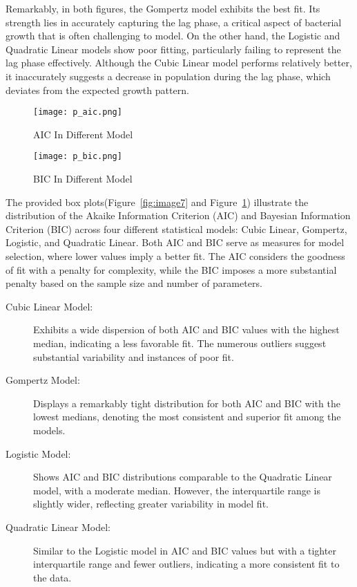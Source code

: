 \documentclass[11pt]{article}
\begin{document}
Remarkably, in both figures, the Gompertz model exhibits the best fit. Its strength lies in accurately capturing the lag phase, a critical aspect of bacterial growth that is often challenging to model. On the other hand, the Logistic and Quadratic Linear models show poor fitting, particularly failing to represent the lag phase effectively. Although the Cubic Linear model performs relatively better, it inaccurately suggests a decrease in population during the lag phase, which deviates from the expected growth pattern.
\begin{figure}[H]
  \centering
  \begin{minipage}{0.48\textwidth}
    \texttt{[image: p\_aic.png]}
    \caption{AIC In Different Model}
    \label{fig:image7}
  \end{minipage}
  \hfill
  \begin{minipage}{0.48\textwidth}
    \texttt{[image: p\_bic.png]}
    \caption{BIC In Different Model}
    \label{fig:image8}
  \end{minipage}
\end{figure}


The provided box plots(Figure~\ref{fig:image7} and Figure~\ref{fig:image8}) illustrate the distribution of the Akaike Information Criterion (AIC) and Bayesian Information Criterion (BIC) across four different statistical models: Cubic Linear, Gompertz, Logistic, and Quadratic Linear. Both AIC and BIC serve as measures for model selection, where lower values imply a better fit. The AIC considers the goodness of fit with a penalty for complexity, while the BIC imposes a more substantial penalty based on the sample size and number of parameters.
\begin{description}
  \item[Cubic Linear Model:]
  Exhibits a wide dispersion of both AIC and BIC values with the highest median, indicating a less favorable fit. The numerous outliers suggest substantial variability and instances of poor fit.
  
  \item[Gompertz Model:]
  Displays a remarkably tight distribution for both AIC and BIC with the lowest medians, denoting the most consistent and superior fit among the models.
  
  \item[Logistic Model:]
  Shows AIC and BIC distributions comparable to the Quadratic Linear model, with a moderate median. However, the interquartile range is slightly wider, reflecting greater variability in model fit.
  
  \item[Quadratic Linear Model:]
  Similar to the Logistic model in AIC and BIC values but with a tighter interquartile range and fewer outliers, indicating a more consistent fit to the data.
\end{description}
 
\end{document}
